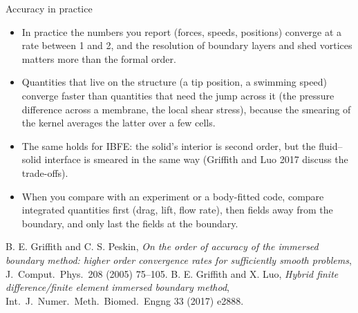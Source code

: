 \documentclass[aspectratio=169,11pt]{beamer}
\begin{document}
\begin{frame}{Accuracy in practice}
\begin{itemize}
  \item In practice the numbers you report (forces, speeds, positions) converge at a rate between 1 and 2, and the resolution of boundary layers and shed vortices matters more than the formal order.
  \item Quantities that live on the structure (a tip position, a swimming speed) converge faster than quantities that need the jump across it (the pressure difference across a membrane, the local shear stress), because the smearing of the kernel averages the latter over a few cells.
  \item The same holds for IBFE: the solid's interior is second order, but the fluid--solid interface is smeared in the same way (Griffith and Luo 2017 discuss the trade-offs).
  \item When you compare with an experiment or a body-fitted code, compare integrated quantities first (drag, lift, flow rate), then fields away from the boundary, and only last the fields at the boundary.
\end{itemize}
\vspace{2mm}
\small B. E. Griffith and C. S. Peskin, \emph{On the order of accuracy of the immersed boundary method: higher order convergence rates for sufficiently smooth problems}, J.\ Comput.\ Phys.\ 208 (2005) 75--105. B. E. Griffith and X. Luo, \emph{Hybrid finite difference/finite element immersed boundary method}, Int.\ J.\ Numer.\ Meth.\ Biomed.\ Engng 33 (2017) e2888.
\end{frame}
\end{document}
